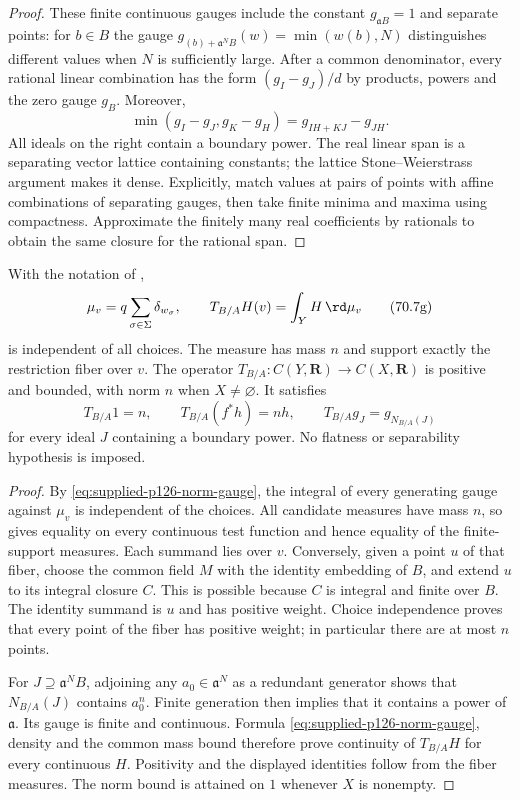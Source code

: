 \begin{proof}
These finite continuous gauges include the constant
$g_{\mathfrak aB}=1$ and separate points: for $b\in B$ the gauge
$g_{(b)+\mathfrak a^N B}(w)=\min(w(b),N)$ distinguishes different values
when $N$ is sufficiently large. After a common denominator, every
rational linear combination has the form $(g_I-g_J)/d$ by products,
powers and the zero gauge $g_B$. Moreover,
\[
 \min(g_I-g_J,g_K-g_H)=g_{IH+KJ}-g_{JH}.
\]
All ideals on the right contain a boundary power. The real linear span
is a separating vector lattice containing constants; the lattice
Stone--Weierstrass argument makes it dense. Explicitly, match values
at pairs of points with affine combinations of separating gauges,
then take finite minima and maxima using compactness. Approximate the
finitely many real coefficients by rationals to obtain the same closure
for the rational span.
\end{proof}

\begin{theorem}\label{thm:supplied-p126-normal-trace}
With the notation of ,
\[
 \mu_v=q\sum_{\sigma\in\Sigma}\delta_{w_\sigma},\qquad
 T_{B/A}H(v)=\int_YH\,\rd\mu_v
 \tag{70.7g}\label{eq:supplied-p126-trace}
\]
is independent of all choices. The measure has mass $n$ and support
exactly the restriction fiber over $v$. The operator
$T_{B/A}:C(Y,\mathbf R)\to C(X,\mathbf R)$ is positive and bounded,
with norm $n$ when $X\ne\varnothing$. It satisfies
\[
 T_{B/A}1=n,\qquad T_{B/A}(f^*h)=nh,\qquad
 T_{B/A}g_J=g_{N_{B/A}(J)}
\]
for every ideal $J$ containing a boundary power. No flatness or
separability hypothesis is imposed.
\end{theorem}

\begin{proof}
By \eqref{eq:supplied-p126-norm-gauge}, the integral of every generating
gauge against $\mu_v$ is independent of the choices. All candidate
measures have mass $n$, so  gives
equality on every continuous test function and hence equality of the
finite-support measures.
Each summand lies over $v$. Conversely, given a point $u$ of that fiber,
choose the common field $M$ with the identity embedding of $B$, and
extend $u$ to its integral closure $C$. This is possible because $C$ is
integral and finite over $B$. The identity summand is $u$ and has
positive weight. Choice independence proves that every point of the
fiber has positive weight; in particular there are at most $n$ points.

For $J\supseteq\mathfrak a^N B$, adjoining any $a_0\in\mathfrak a^N$
as a redundant generator shows that $N_{B/A}(J)$ contains $a_0^n$.
Finite generation then implies that it contains a power of
$\mathfrak a$. Its gauge is finite and continuous. Formula
\eqref{eq:supplied-p126-norm-gauge}, density and the common mass bound
therefore prove continuity of $T_{B/A}H$ for every continuous $H$.
Positivity and the displayed identities follow from the fiber measures.
The norm bound is attained on $1$ whenever $X$ is nonempty.
\end{proof}

